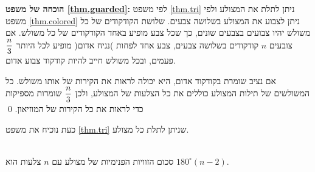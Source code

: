 \begin{center}

\end{center}


\textbf{הוכחה של משפט
\ref{thm.guarded}:}
לפי משפט
\ref{thm.tri}
ניתן לתלת את המצולע ולפי משפט
\ref{thm.colored}
ניתן לצבוע את המצולע בשלושה צבעים. שלושת הקודקודים של כל משולש יהיו צבועים בצבעים שונים, כך שכל צבע מופיע באחד הקודקודים של כל משולש. אם צובעים 
$n$
קודקודים בשלושה צבעים, צבע אחד לפחות )נניח אדום( מופיע לכל היותר
$\displaystyle\frac{n}{3}$
פעמים, ובכל משולש חייב להיות קודקוד צבוע אדום.

אם נציב שומרת בקודקוד אדום, היא יכולה לראות את הקירות של אותו משולש. כל המשולשים של תילות המצולע כוללים את כל הצלעות של המצולע, ולכן
$\displaystyle\frac{n}{3}$
שומרות מספיקות כדי לראות את כל הקירות של המוזיאון.
\qed

כעת נוכיח את משפט
\ref{thm.tri}
שניתן לתלת כל מצולע.

\begin{theorem}\label{thm.interior-angles-of-a-polygon}\mbox{}\\
סכום הזוויות הפנימיות של מצולע עם
$n$
צלעות הוא
$180^\circ(n-2)$.
\end{theorem}



